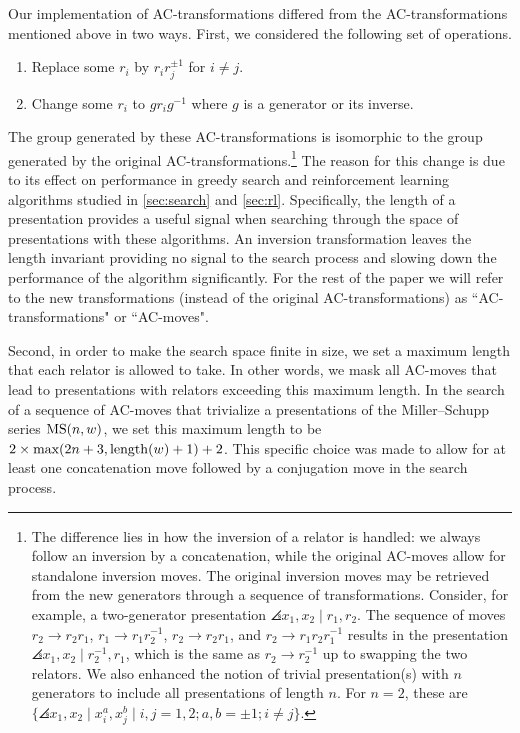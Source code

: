 Our implementation of AC-transformations differed from the AC-transformations mentioned above in two ways.
First, we considered the following set of operations.
\begin{enumerate}[label=(AC$'$\arabic*)]
	\item Replace some $r_i$ by $r_i r_j^{\pm 1}$ for $i \neq j$.
	\item Change some $r_i$ to $g r_i g^{-1}$ where $g$ is a generator or its inverse.
\end{enumerate}
The group generated by these AC-transformations is isomorphic to the group generated by the original AC-transformations.\footnote{
The difference lies in how the inversion of a relator is handled: we always follow an inversion by a concatenation, while the original AC-moves allow for standalone inversion moves.
The original inversion moves may be retrieved from the new generators through a sequence of transformations.
Consider, for example, a two-generator presentation $\angles{x_1, x_2 \mid r_1, r_2}$. The sequence of moves $r_2 \to r_2 r_1$, $r_1 \to r_1 r_2^{-1}$, $r_2 \to r_2 r_1$, and $r_2 \to r_1 r_2 r_1^{-1}$ results in the presentation $\angles{x_1, x_2 \mid r_2^{-1}, r_1}$, which is the same as $r_2 \to r_2^{-1}$ up to swapping the two relators.
We also enhanced the notion of trivial presentation(s) with $n$ generators to include all presentations of length $n$. For $n=2$, these are $\{\angles{x_1, x_2 \mid x_i^{a}, x_j^{b}} \mid i, j = 1, 2; a, b = \pm 1; i \neq j \}$.
}
The reason for this change is due to its effect on performance in greedy search and reinforcement learning algorithms studied in \autoref{sec:search} and \autoref{sec:rl}.
Specifically, the length of a presentation provides a useful signal when searching through the space of presentations with these algorithms.
An inversion transformation leaves the length invariant providing no signal to the search process and slowing down the performance of the algorithm significantly.
For the rest of the paper we will refer to the new transformations (instead of the original AC-transformations) as ``AC-transformations" or ``AC-moves".

Second, in order to make the search space finite in size, we set a maximum length that each relator is allowed to take. In other words, we mask all AC-moves that lead to presentations with relators exceeding this maximum length.
In the search of a sequence of AC-moves that trivialize a presentations of the Miller--Schupp series $\text{MS}(n, w)$, we set this maximum length to be $2 \times \text{max}(2 n+3, \operatorname{length}(w)+1) + 2$.
This specific choice was made to allow for at least one concatenation move followed by a conjugation move in the search process.
